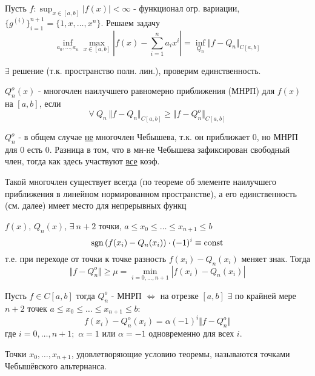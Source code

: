 \begin{ticket}
  Пусть $f:\sup_{x\in[a,b]}|f(x)|<\infty$ - функционал огр. вариации, $\{g^{(i)}\}_{i=1}^{n+1}=\{1,x,\ldots,x^n\}$. Решаем задачу
  \begin{equation}\label{contig::task}
    \inf_{a_0,\ldots,a_n}\max_{x\in[a,b]}\left|f(x)-\sum_{i=1}^na_ix^i\right|=\inf_{Q_n}\Vert f-Q_n\Vert_{C[a,b]}
  \end{equation}

  $\exists$ решение (т.к. пространство полн. лин.), проверим единственность.
  \begin{definition}
    $Q_n^o(x)$ - многочлен наилучшего равномерно приближения (МНРП) для $f(x)$ на $[a,b]$,
    если $$\forall\ Q_n\ \Vert f- Q_n\Vert_{C[a,b]}\geq\Vert f- Q_n^o\Vert_{C[a,b]}$$
  \end{definition}
  \begin{remark*}
    $Q_n^o$ - в общем случае \underline{не} многочлен Чебышева, т.к. он приближает 0,
    но МНРП для 0 есть 0. Разница в том, что в мн-не Чебышева зафиксирован свободный член, тогда
    как здесь участвуют \underline{все} коэф.
  \end{remark*}
  \begin{remark*}
    Такой многочлен существует всегда (по теореме об элементе наилучшего
    приближения в линейном нормированном пространстве), а его единственность (см. далее) имеет место для непрерывных функц
  \end{remark*}
  \begin{theorem}
    $f(x)$, $Q_n(x)$, $\exists\ n+2$ точки, $a\leq x_0\leq\ldots\leq x_{n+1}\leq b$
    $$\operatorname{sgn}{\left(f(x_i)-Q_n(x_i)\right)}\cdot (-1)^i\equiv\mathrm{const}$$
    т.е. при переходе от точки к точке разность $f(x_i)-Q_n(x_i)$ меняет знак. Тогда
    $$\Vert f- Q_n^o\Vert\geq\mu=\min_{i=0,\ldots,n+1}\left|f(x_i)-Q_n(x_i)\right|$$
  \end{theorem}
  \begin{theorem}[Чебышев]
    Пусть $f\in C[a,b]$ тогда $Q_n^o$ - МНРП $\Leftrightarrow$ на отрезке $[a,b]$ $\exists$
    по крайней мере $n+2$ точек $a\leq x_0\leq\ldots\leq x_{n+1}\leq b$:
    $$f(x_i)-Q_n^o(x_i)=\alpha(-1)^i\Vert f-Q_n^o\Vert$$
    где $i=0,\ldots, n+1;$ $\alpha=1$ или $\alpha=-1$ одновременно для всех $i$.
  \end{theorem}
  Точки $x_0,\ldots,x_{n+1}$, удовлетворяющие условию теоремы, называются точками Чебышёвского альтернанса.

\end{ticket}
